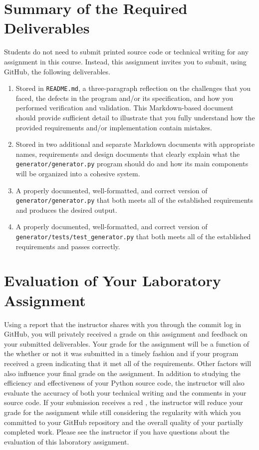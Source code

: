 \documentclass[11pt]{article}
\newcommand{\mainprogramsource}{\lstinline{generator/generator.py}}
\newcommand{\maintestsource}{\lstinline{generator/tests/test_generator.py}}
\newcommand{\reflection}{\lstinline{README.md}}
\newcommand{\checkmark}{\ding{51}}
\newcommand{\naughtmark}{\ding{55}}
\begin{document}
\section*{Summary of the Required Deliverables}

\noindent Students do not need to submit printed source code or technical writing for any assignment in this course.
Instead, this assignment invites you to submit, using GitHub, the following deliverables.

\begin{enumerate}

\setlength{\itemsep}{0in}

\item Stored in \reflection{}, a three-paragraph reflection on the challenges that you faced, the defects in the program
  and/or its specification, and how you performed verification and validation. This Markdown-based document should
  provide sufficient detail to illustrate that you fully understand how the provided requirements and/or implementation
  contain mistakes.

\item Stored in two additional and separate Markdown documents with appropriate names, requirements and design documents
  that clearly explain what the \mainprogramsource{} program should do and how its main components will be organized
  into a cohesive system.

\item A properly documented, well-formatted, and correct version of \mainprogramsource{} that both meets all of the
  established requirements and produces the desired output.

\item A properly documented, well-formatted, and correct version of \maintestsource{} that both meets all of the
  established requirements and passes correctly.

\end{enumerate}

\section*{Evaluation of Your Laboratory Assignment}

Using a report that the instructor shares with you through the commit log in GitHub, you will privately received a grade
on this assignment and feedback on your submitted deliverables. Your grade for the assignment will be a function of the
whether or not it was submitted in a timely fashion and if your program received a green \checkmark{} indicating that it
met all of the requirements. Other factors will also influence your final grade on the assignment. In addition to
studying the efficiency and effectiveness of your Python source code, the instructor will also evaluate the accuracy of
both your technical writing and the comments in your source code. If your submission receives a red \naughtmark{}, the
instructor will reduce your grade for the assignment while still considering the regularity with which you committed to
your GitHub repository and the overall quality of your partially completed work. Please see the instructor if you have
questions about the evaluation of this laboratory assignment.
\end{document}
